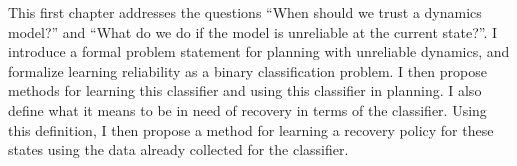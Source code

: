 This first chapter addresses the questions ``When should we trust a dynamics model?'' and  ``What do we do if the model is unreliable at the current state?''. I introduce a formal problem statement for planning with unreliable dynamics, and formalize learning reliability as a binary classification problem. I then propose methods for learning this classifier and using this classifier in planning. I also define what it means to be in need of recovery in terms of the classifier. Using this definition, I then propose a method for learning a recovery policy for these states using the data already collected for the classifier.






